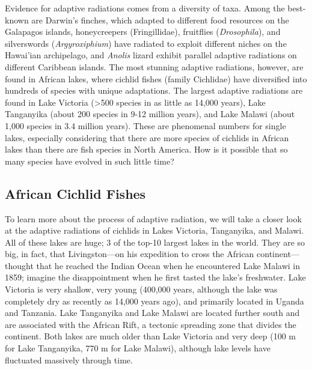 \documentclass[
]{book}
\begin{document}
Evidence for adaptive radiations comes from a diversity of taxa. Among the best-known are Darwin's finches, which adapted to different food resources on the Galapagos islands, honeycreepers (Fringillidae), fruitflies (\emph{Drosophila}), and silverswords (\emph{Argyroxiphium}) have radiated to exploit different niches on the Hawai'ian archipelago, and \emph{Anolis} lizard exhibit parallel adaptive radiations on different Caribbean islands. The most stunning adaptive radiations, however, are found in African lakes, where cichlid fishes (family Cichlidae) have diversified into hundreds of species with unique adaptations. The largest adaptive radiations are found in Lake Victoria (\textgreater500 species in as little as 14,000 years), Lake Tanganyika (about 200 species in 9-12 million years), and Lake Malawi (about 1,000 species in 3.4 million years). These are phenomenal numbers for single lakes, especially considering that there are more species of cichlids in African lakes than there are fish species in North America. How is it possible that so many species have evolved in such little time?

\hypertarget{african-cichlid-fishes}{%
\subsection{African Cichlid Fishes}\label{african-cichlid-fishes}}

To learn more about the process of adaptive radiation, we will take a closer look at the adaptive radiations of cichlids in Lakes Victoria, Tanganyika, and Malawi. All of these lakes are huge; 3 of the top-10 largest lakes in the world. They are so big, in fact, that Livingston---on his expedition to cross the African continent---thought that he reached the Indian Ocean when he encountered Lake Malawi in 1859; imagine the disappointment when he first tasted the lake's freshwater. Lake Victoria is very shallow, very young (400,000 years, although the lake was completely dry as recently as 14,000 years ago), and primarily located in Uganda and Tanzania. Lake Tanganyika and Lake Malawi are located further south and are associated with the African Rift, a tectonic spreading zone that divides the continent. Both lakes are much older than Lake Victoria and very deep (100 m for Lake Tanganyika, 770 m for Lake Malawi), although lake levels have fluctuated massively through time.
\end{document}
